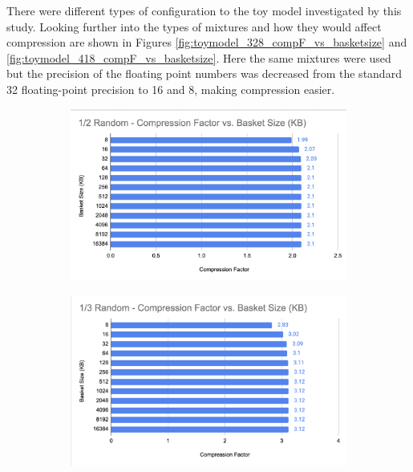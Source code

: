 There were different types of configuration to the toy model investigated by this study. 
Looking further into the types of mixtures and how they would affect compression are shown in Figures \ref{fig:toymodel_328_compF_vs_basketsize} and \ref{fig:toymodel_418_compF_vs_basketsize}. 
Here the same mixtures were used but the precision of the floating point numbers was decreased from the standard 32 floating-point precision to 16 and 8, making compression easier. 

\begin{figure}[h]
    \centering
    \begin{subfigure}{.5\textwidth}
        \centering
        \includegraphics[width=\textwidth]{content/toymodel_content/3.28/1_of_2.png}
        \label{fig:toymodel_328_compF_vs_basketsize_subA}
      \end{subfigure}%
      \begin{subfigure}{.5\textwidth}
        \centering
        \includegraphics[width=\textwidth]{content/toymodel_content/3.28/1_of_3.png}

\end{subfigure}
\end{figure}

